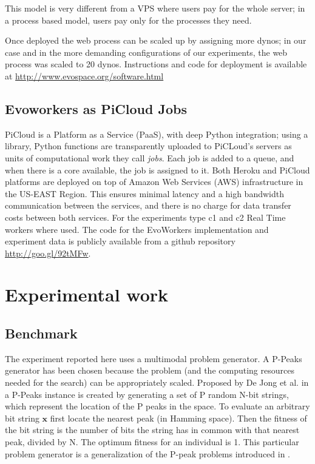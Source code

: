 \documentclass{llncs}
\begin{document}
This model is very different from a VPS where users pay for the
whole server; in a process based model, users pay only for the
processes they need.

Once deployed the web process can be scaled up by assigning more dynos;
in our case and in the more demanding configurations of our experiments, 
the web process was scaled to 20 dynos. Instructions and code for deployment 
is available at \url{http://www.evospace.org/software.html}

\subsection{Evoworkers as PiCloud Jobs}
PiCloud is a Platform as a Service (PaaS), with deep Python integration; 
using a library, Python functions are transparently uploaded to PiCLoud's 
servers as units of computational work they call \emph{jobs}. 
Each job is added to a queue, and when there is a core available, 
the job is assigned to it. Both Heroku and PiCloud 
platforms are deployed  on top of Amazon Web Services (AWS) 
infrastructure in the US-EAST Region. This ensures minimal 
latency and a high bandwidth communication between the services, 
and there is no charge for data transfer costs between both services.
For the experiments type c1 and c2 Real Time workers where used.  
The code for the EvoWorkers implementation and experiment data is publicly available 
from a github repository \url{http://goo.gl/92tMFw}.

\section{Experimental work}
\label{sec:experiments}
\subsection{Benchmark}
\label{ss:benchmark}
The experiment reported here uses a multimodal problem generator. A P-Peaks generator
has been chosen because the problem (and the computing resources needed for the search) 
can be appropriately scaled. Proposed by De Jong et al. in \cite{Jong:PS97} a
P-Peaks instance is created by generating a set of P random N-bit
strings, which represent the location of the P peaks in the space. To
evaluate an arbitrary bit string \begin{math} \mathbf{x} \end{math}
first locate the nearest peak (in Hamming space). Then the fitness of
the bit string is the number of bits the string has in common with
that nearest peak, divided by N. The optimum fitness for an individual
is 1. This particular problem generator is a generalization of the
P-peak problems introduced in \cite{Jong:1990}.            
\end{document}
